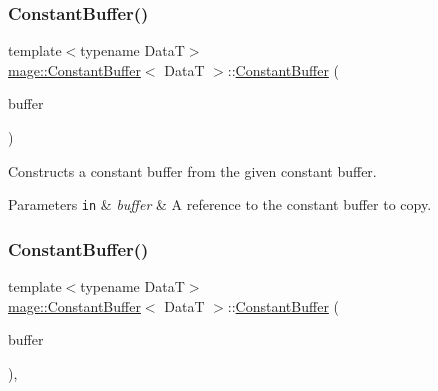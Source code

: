 \subsubsection{\texorpdfstring{Constant\+Buffer()}{ConstantBuffer()}\hspace{0.1cm}{\footnotesize\ttfamily [3/4]}}
{\footnotesize\ttfamily template$<$typename DataT$>$ \\
\hyperlink{classmage_1_1_constant_buffer}{mage\+::\+Constant\+Buffer}$<$ DataT $>$\+::\hyperlink{classmage_1_1_constant_buffer}{Constant\+Buffer} (\begin{DoxyParamCaption}\item[{const \hyperlink{classmage_1_1_constant_buffer}{Constant\+Buffer}$<$ DataT $>$ \&}]{buffer }\end{DoxyParamCaption})\hspace{0.3cm}{\ttfamily [delete]}}

Constructs a constant buffer from the given constant buffer.


\begin{DoxyParams}[1]{Parameters}
\mbox{\tt in}  & {\em buffer} & A reference to the constant buffer to copy. \\
\hline
\end{DoxyParams}
\hypertarget{classmage_1_1_constant_buffer_aeb0642e0e405eeb18658c0962a52f406}{}\label{classmage_1_1_constant_buffer_aeb0642e0e405eeb18658c0962a52f406} 
\subsubsection{\texorpdfstring{Constant\+Buffer()}{ConstantBuffer()}\hspace{0.1cm}{\footnotesize\ttfamily [4/4]}}
{\footnotesize\ttfamily template$<$typename DataT$>$ \\
\hyperlink{classmage_1_1_constant_buffer}{mage\+::\+Constant\+Buffer}$<$ DataT $>$\+::\hyperlink{classmage_1_1_constant_buffer}{Constant\+Buffer} (\begin{DoxyParamCaption}\item[{\hyperlink{classmage_1_1_constant_buffer}{Constant\+Buffer}$<$ DataT $>$ \&\&}]{buffer }\end{DoxyParamCaption})\hspace{0.3cm}{\ttfamily [default]}, {\ttfamily [noexcept]}}


